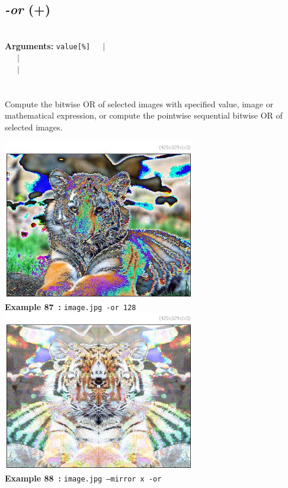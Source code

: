 \documentclass[a4paper,11pt,twoside]{book}
\begin{document}
\subsection{\emph{-or} (+)}\vspace*{-0.5em}
~\\\textbf{Arguments: } 
{\small \texttt{value[\%]}}~~~$|$\\
\hspace*{2.2cm}{\small \texttt{[image]}}~~~$|$\\
~~~$|$\\
\\~\\
Compute the bitwise OR of selected images with specified value, image or mathematical
expression, or compute the pointwise sequential bitwise OR of selected images.
\begin{center}\includegraphics[keepaspectratio=true,height=7cm,width=\textwidth]{img/gmic_def87.jpg}\\
{\footnotesize \textbf{Example 87~:} \texttt{image.jpg -or 128}}
\\\includegraphics[keepaspectratio=true,height=7cm,width=\textwidth]{img/gmic_def88.jpg}\\
{\footnotesize \textbf{Example 88~:} \texttt{image.jpg --mirror x -or}}
\end{center}
\end{document}
